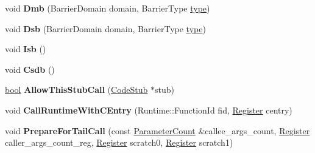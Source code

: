 \begin{DoxyCompactItemize}
\item 
\mbox{\label{classv8_1_1internal_1_1TurboAssembler_ae0f9edae29388c31bae0bec32f0f2150}} 
void {\bfseries Dmb} (Barrier\+Domain domain, Barrier\+Type \mbox{\hyperlink{classstd_1_1conditional_1_1type}{type}})
\item 
\mbox{\label{classv8_1_1internal_1_1TurboAssembler_a70b9651607c7749562704aeb02beec2a}} 
void {\bfseries Dsb} (Barrier\+Domain domain, Barrier\+Type \mbox{\hyperlink{classstd_1_1conditional_1_1type}{type}})
\item 
\mbox{\label{classv8_1_1internal_1_1TurboAssembler_a7862ff7a559bac4233f83636c8e2517a}} 
void {\bfseries Isb} ()
\item 
\mbox{\label{classv8_1_1internal_1_1TurboAssembler_ab07841f2667cb041230865b5a6b173c7}} 
void {\bfseries Csdb} ()
\item 
\mbox{\label{classv8_1_1internal_1_1TurboAssembler_a20348b464d89447388016d14eb6cb7e3}} 
\mbox{\hyperlink{classbool}{bool}} {\bfseries Allow\+This\+Stub\+Call} (\mbox{\hyperlink{classv8_1_1internal_1_1CodeStub}{Code\+Stub}} $\ast$stub)
\item 
\mbox{\label{classv8_1_1internal_1_1TurboAssembler_a402a6ba1a950da97bcbbf500be586951}} 
void {\bfseries Call\+Runtime\+With\+C\+Entry} (Runtime\+::\+Function\+Id fid, \mbox{\hyperlink{classv8_1_1internal_1_1Register}{Register}} centry)
\item 
\mbox{\label{classv8_1_1internal_1_1TurboAssembler_a39e544d96166c4b553cc204fae211b68}} 
void {\bfseries Prepare\+For\+Tail\+Call} (const \mbox{\hyperlink{classv8_1_1internal_1_1ParameterCount}{Parameter\+Count}} \&callee\+\_\+args\+\_\+count, \mbox{\hyperlink{classv8_1_1internal_1_1Register}{Register}} caller\+\_\+args\+\_\+count\+\_\+reg, \mbox{\hyperlink{classv8_1_1internal_1_1Register}{Register}} scratch0, \mbox{\hyperlink{classv8_1_1internal_1_1Register}{Register}} scratch1)
\item 
\mbox{\label{classv8_1_1internal_1_1TurboAssembler_a662e721293e21b26a146af007a839080}} 

\end{DoxyCompactItemize}
